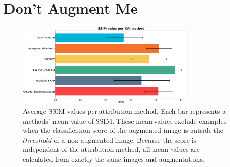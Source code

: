 \section{Don’t Augment Me\protect\footnotemark[1]}\label{results:dont-augment-me}


\vspace{-1.5\baselineskip}
\begin{figure}[ht]
  \centering
  \includegraphics[width=0.8\textwidth]{results/augment-img/results-all.png}
  \caption{Average SSIM values per attribution method. Each bar represents a methods' mean value of SSIM. These mean values exclude examples when the classification score of the augmented image is outside the $threshold$ of a non-augmented image. Because the score is independent of the attribution method, all mean values are calculated from exactly the same images and augmentations.}\label{fig:SSIM-mean-std}
\end{figure}

